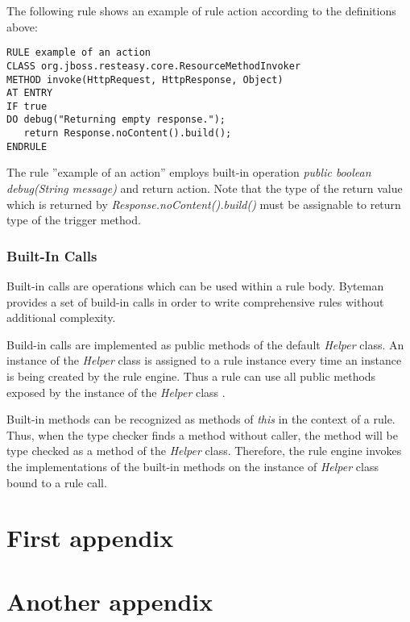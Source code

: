 \documentclass[12pt,oneside]{fithesis2}
\begin{document}
The following rule shows an example of rule action according to the definitions above:
\begin{lstlisting}[caption = Rule Action, label = rule_action_code]
RULE example of an action
CLASS org.jboss.resteasy.core.ResourceMethodInvoker
METHOD invoke(HttpRequest, HttpResponse, Object)
AT ENTRY
IF true
DO debug("Returning empty response.");
   return Response.noContent().build();
ENDRULE
\end{lstlisting}

The rule ''example of an action'' employs built-in operation \textit{public boolean debug(String message)}  and return action. Note that the type of the return value which is returned by \textit{Response.noContent().build()} must be assignable to return type of the trigger method.

\subsection{Built-In Calls}
Built-in calls are operations which can be used within a rule body. Byteman provides a set of build-in calls in order to write comprehensive rules without additional complexity.

Build-in calls are implemented as public methods of the default \textit{Helper} class. An instance of the \textit{Helper} class is assigned to a rule instance every time an instance is being created by the rule engine. Thus a rule can use all public methods exposed by the instance of the \textit{Helper} class \cite[Built-In Calls]{byteman_doc}.

Built-in methods can be recognized as methods of \textit{this} in the context of a rule. Thus, when the type checker finds a method without caller, the method will be type checked as a method of the \textit{Helper} class. Therefore, the rule engine invokes the implementations of the built-in methods on the instance of \textit{Helper} class bound to a rule call.

    \appendix
    \chapter{First appendix}        %
    \Blindtext
    \chapter{Another appendix}
    \Blindtext



\end{document}
